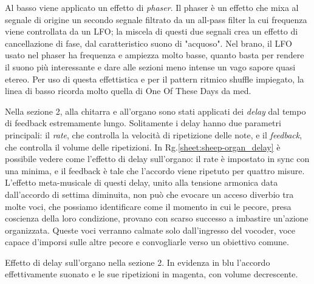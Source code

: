 \documentclass[class=book, crop=false, oneside, 12pt]{standalone}
\begin{document}
    Al basso viene applicato un effetto di \emph{phaser}. Il phaser è un effetto che mixa al segnale di origine un secondo segnale filtrato da un all-pass filter la cui frequenza viene controllata da un LFO; la miscela di questi due segnali crea un effetto di cancellazione di fase, dal caratteristico suono di "acquoso". Nel brano, il LFO usato nel phaser ha frequenza e ampiezza molto basse, quanto basta per rendere il suono più interessante e dare alle sezioni meno intense un vago sapore quasi etereo. Per uso di questa effettistica e per il pattern ritmico shuffle impiegato, la linea di basso ricorda molto quella di One Of These Days da \acrshort{med}.

    Nella sezione 2, alla chitarra e all'organo sono stati applicati dei \emph{delay} dal tempo di feedback estremamente lungo. Solitamente i delay hanno due parametri principali: il \emph{rate}, che controlla la velocità di ripetizione delle note, e il \emph{feedback}, che controlla il volume delle ripetizioni. In Rg.\ref{sheet:sheep-organ_delay} è possibile vedere come l'effetto di delay sull'organo: il rate è impostato in sync con una minima, e il feedback è tale che l'accordo viene ripetuto per quattro misure. L'effetto meta-musicale di questi delay, unito alla tensione armonica data dall'accordo di settima diminuita, non può che evocare un acceso diverbio tra molte voci, che possiamo identificare come il momento in cui le pecore, presa coscienza della loro condizione, provano con scarso successo a imbastire un'azione organizzata. Queste voci verranno calmate solo dall'ingresso del vocoder, voce capace d'imporsi sulle altre pecore e convogliarle verso un obiettivo comune.

    \begin{sheet}[htb]
        \centering
        \caption[Effetto di delay sull'organo.]{Effetto di delay sull'organo nella sezione 2. In evidenza in blu l'accordo effettivamente suonato  e le sue ripetizioni in magenta, con volume decrescente.}
        \label{sheet:sheep-organ_delay}
    \end{sheet}

\end{document}
